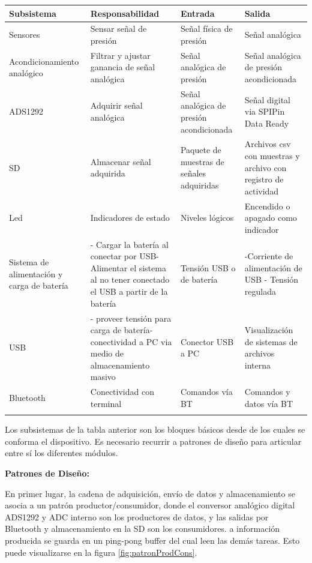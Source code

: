 \footnotesize
\begin{tabularx}{\textwidth}{XXXX}
\hline
\textbf{Subsistema} & \textbf{Responsabilidad} & \textbf{Entrada} & \textbf{Salida} \\ \hline
Sensores & Sensar señal de presión & Señal física de presión & Señal analógica \\ \hline
Acondicionamiento analógico & Filtrar y ajustar ganancia de señal analógica & Señal analógica de presión & Señal analógica de presión acondicionada \\ \hline
ADS1292 & Adquirir señal analógica & Señal analógica de presión acondicionada & Señal digital via SPIPin Data Ready \\ \hline
SD & Almacenar señal adquirida & Paquete de muestras de señales adquiridas & Archivos csv con muestras y archivo con registro de actividad \\ \hline
Led & Indicadores de estado & Niveles lógicos & Encendido o apagado como indicador \\ \hline
Sistema de alimentación y carga de batería & - Cargar la batería al conectar por USB- Alimentar el sistema al no tener conectado el USB a partir de la batería & Tensión USB o de batería & -Corriente de alimentación de USB - Tensión regulada \\ \hline
USB & - proveer tensión para carga de batería- conectividad a PC via medio de almacenamiento masivo & Conector USB a PC & Visualización de sistemas de archivos interna \\ \hline
Bluetooth & Conectividad con terminal & Comandos vía BT & Comandos y datos vía BT \\ \hline
\caption{Subsistemas del equipo}
\label{tab:subsistemas}\\
\end{tabularx}
\normalsize

Los subsistemas de la tabla anterior son los bloques básicos desde de los cuales se conforma el dispositivo. Es necesario recurrir a patrones de diseño para articular entre sí los diferentes módulos.

\textbf{Patrones de Diseño:}

En primer lugar, la cadena de adquisición, envío de datos y almacenamiento se asocia a un patrón productor/consumidor, donde el conversor analógico digital ADS1292 y ADC interno son los productores de datos, y las salidas por Bluetooth y almacenamiento en la SD son los consumidores. a información producida se guarda en un ping-pong buffer \citep{zhou2017} del cual leen las demás tareas. Esto puede visualizarse en la figura \ref{fig:patronProdCons}.

